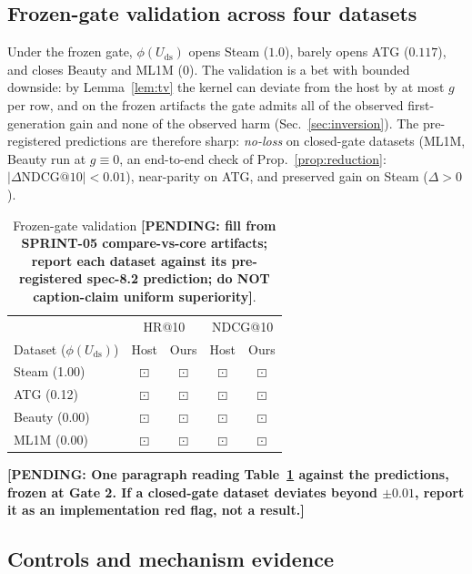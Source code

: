 \documentclass[letterpaper]{article}
\newcommand{\pending}[1]{{\color{red}\textbf{[PENDING: #1]}}}
\newcommand{\pnum}{{\color{red}$\boxdot$}}         %
\newcommand{\Uds}{U_{\mathrm{ds}}}
\newcommand{\phids}{\phi(\Uds)}
\begin{document}
\subsection{Frozen-gate validation across four datasets}
\label{sec:validation}

Under the frozen gate, $\phids$ opens Steam ($1.0$), barely opens ATG
($0.117$), and closes Beauty and ML1M ($0$). The validation is a bet
with bounded downside: by Lemma~\ref{lem:tv} the kernel can deviate
from the host by at most $g$ per row, and on the frozen artifacts the
gate admits all of the observed first-generation gain and none of the
observed harm (Sec.~\ref{sec:inversion}). The pre-registered
predictions are therefore sharp: \emph{no-loss} on closed-gate datasets
(ML1M, Beauty run at $g\equiv 0$, an end-to-end check of
Prop.~\ref{prop:reduction}: $|\Delta\text{NDCG@10}|<0.01$), near-parity
on ATG, and preserved gain on Steam ($\Delta>0$).

\begin{table}[t]
\centering
\small
\begin{tabular}{lcccc}
\toprule
 & \multicolumn{2}{c}{HR@10} & \multicolumn{2}{c}{NDCG@10} \\
Dataset ($\phids$) & Host & Ours & Host & Ours \\
\midrule
Steam (1.00)  & \pnum & \pnum & \pnum & \pnum \\
ATG (0.12)    & \pnum & \pnum & \pnum & \pnum \\
Beauty (0.00) & \pnum & \pnum & \pnum & \pnum \\
ML1M (0.00)   & \pnum & \pnum & \pnum & \pnum \\
\bottomrule
\end{tabular}
\caption{Frozen-gate validation \pending{fill from SPRINT-05
compare-vs-core artifacts; report each dataset against its
pre-registered spec-8.2 prediction; do NOT caption-claim uniform
superiority}.}
\label{tab:validation}
\end{table}

\pending{One paragraph reading Table~\ref{tab:validation} against the
predictions, frozen at Gate 2. If a closed-gate dataset deviates beyond
$\pm 0.01$, report it as an implementation red flag, not a result.}

\subsection{Controls and mechanism evidence}
\label{sec:mechanism}
\end{document}
